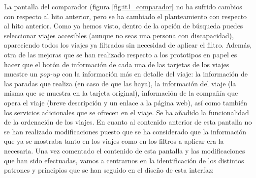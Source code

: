 La pantalla del comparador (figura \ref{fig:it1_comparador} no ha sufrido cambios con respecto al hito anterior, pero se ha cambiado el planteamiento
con respecto al hito anterior. Como ya hemos visto, dentro de la opción de búsqueda puedes seleccionar viajes
accesibles (aunque no seas una persona con discapacidad), apareciendo todos los viajes ya filtrados sin necesidad
de aplicar el filtro. Además, otra de las mejoras que se han realizado respecto a los prototipos en papel es hacer
que el botón de información de cada una de las tarjetas de los viajes muestre un \textit{pop-up} con la información más en
detalle del viaje: la información de las paradas que realiza (en caso de que las haya), la información del viaje
(la misma que se muestra en la tarjeta original), información de la compañía que opera el viaje (breve descripción
y un enlace a la página web), así como también los servicios adicionales que se ofrecen en el viaje. Se ha añadido
la funcionalidad de la ordenación de los viajes. En cuanto al contenido anterior de esta pantalla no se han realizado
modificaciones puesto que se ha considerado que la información que ya se mostraba tanto en los viajes como en los
filtros a aplicar era la necesaria. Una vez comentado el contenido de esta pantalla y las modificaciones que han
sido efectuadas, vamos a centrarnos en la identificación de los distintos patrones y principios que se han seguido
en el diseño de esta interfaz:

